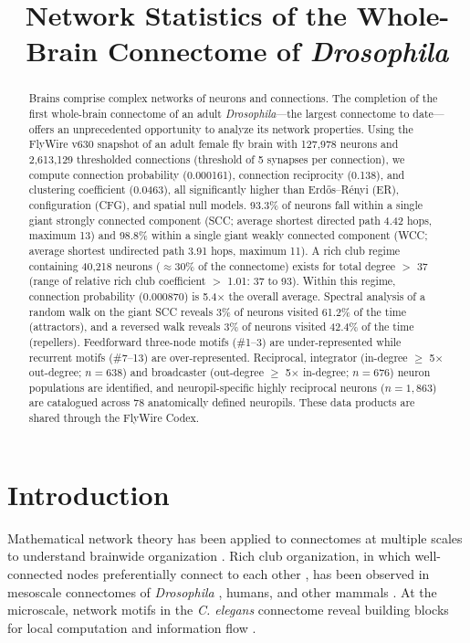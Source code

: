 \documentclass[11pt]{article}
\title{Network Statistics of the Whole-Brain Connectome of \emph{Drosophila}}
\author{}
\date{}
\begin{document}
\maketitle

\begin{abstract}
Brains comprise complex networks of neurons and connections. The completion of the first whole-brain connectome of an adult \emph{Drosophila}---the largest connectome to date---offers an unprecedented opportunity to analyze its network properties. Using the FlyWire v630 snapshot of an adult female fly brain with 127{,}978 neurons and 2{,}613{,}129 thresholded connections (threshold of 5 synapses per connection), we compute connection probability (0.000161), connection reciprocity (0.138), and clustering coefficient (0.0463), all significantly higher than Erd\H{o}s--R\'enyi (ER), configuration (CFG), and spatial null models. 93.3\% of neurons fall within a single giant strongly connected component (SCC; average shortest directed path 4.42 hops, maximum 13) and 98.8\% within a single giant weakly connected component (WCC; average shortest undirected path 3.91 hops, maximum 11). A rich club regime containing 40{,}218 neurons ($\approx$30\% of the connectome) exists for total degree $>$ 37 (range of relative rich club coefficient $>$ 1.01: 37 to 93). Within this regime, connection probability (0.000870) is 5.4$\times$ the overall average. Spectral analysis of a random walk on the giant SCC reveals 3\% of neurons visited 61.2\% of the time (attractors), and a reversed walk reveals 3\% of neurons visited 42.4\% of the time (repellers). Feedforward three-node motifs (\#1--3) are under-represented while recurrent motifs (\#7--13) are over-represented. Reciprocal, integrator (in-degree $\geq$ 5$\times$ out-degree; $n=638$) and broadcaster (out-degree $\geq$ 5$\times$ in-degree; $n=676$) neuron populations are identified, and neuropil-specific highly reciprocal neurons ($n=1{,}863$) are catalogued across 78 anatomically defined neuropils. These data products are shared through the FlyWire Codex.
\end{abstract}

\section{Introduction}
Mathematical network theory has been applied to connectomes at multiple scales to understand brainwide organization \cite{bullmore2009complex,varshney2011structural,vandenheuvel2011richclub,harriger2012richclub,jarrell2012connectome,motiftemplate1,cook2019whole}. Rich club organization, in which well-connected nodes preferentially connect to each other \cite{colizza2006detecting,vandenheuvel2011richclub,towlson2013rich}, has been observed in mesoscale connectomes of \emph{Drosophila} \cite{shih2015connectomics,worrell2017optimized}, humans, and other mammals \cite{harriger2012richclub,sporns2007identification,vandenheuvel2011richclub}. At the microscale, network motifs \cite{milo2002network,milo2004superfamilies} in the \emph{C. elegans} connectome reveal building blocks for local computation and information flow \cite{varshney2011structural,cook2019whole,towlson2013rich,white1986structure}.
\end{document}
